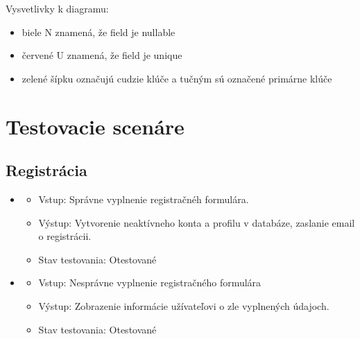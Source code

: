 \documentclass[12pt,a4paper]{report}
\theoremstyle{definition}
\theoremstyle{remark}
\begin{document}
Vysvetlivky k diagramu:
\begin{itemize}
\item biele N znamená, že field je nullable
\item červené U znamená, že field je unique
\item zelené šípku označujú cudzie klúče a tučným sú označené primárne klúče
\end{itemize}

\chapter{Testovacie scenáre}
\section{Registrácia}
\begin{itemize}
	\item\begin{itemize}
	\item Vstup: Správne vyplnenie registračnéh formulára.
	\item Výstup: Vytvorenie neaktívneho konta a profilu v databáze, zaslanie email o registrácii.
	\item Stav testovania: Otestované
	\end{itemize}
	
	
	
	\item\begin{itemize}
	\item Vstup: Nesprávne vyplnenie registračného formulára
	\item Výstup: Zobrazenie informácie užívateľovi o zle vyplnených údajoch.
	\item Stav testovania: Otestované
	\end{itemize}
	

\end{itemize}
\end{document}

